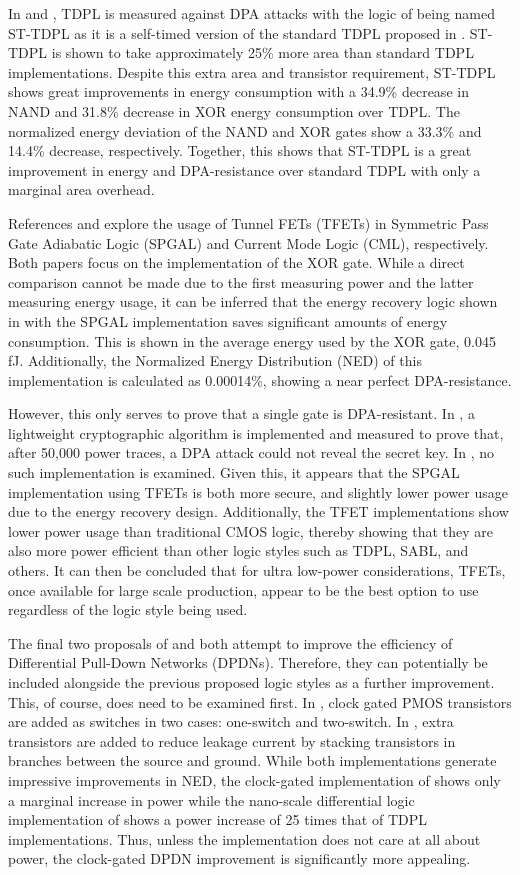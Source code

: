 \documentclass[conference, 12pt]{IEEEtran}
\begin{document}
		In \cite{b1} and \cite{b2}, TDPL is measured against DPA attacks with the logic of \cite{b2} being named ST-TDPL as it is a self-timed version of the standard TDPL proposed in \cite{b1}. ST-TDPL is shown to take approximately 25\% more area than standard TDPL implementations. Despite this extra area and transistor requirement, ST-TDPL shows great improvements in energy consumption with a 34.9\% decrease in NAND and 31.8\% decrease in XOR energy consumption over TDPL. The normalized energy deviation of the NAND and XOR gates show a 33.3\% and 14.4\% decrease, respectively. Together, this shows that ST-TDPL is a great improvement in energy and DPA-resistance over standard TDPL with only a marginal area overhead. 

		References \cite{b3} and \cite{b4} explore the usage of Tunnel FETs (TFETs) in Symmetric Pass Gate Adiabatic Logic (SPGAL) and Current Mode Logic (CML), respectively. Both papers focus on the implementation of the XOR gate. While a direct comparison cannot be made due to the first measuring power and the latter measuring energy usage, it can be inferred that the energy recovery logic shown in \cite{b3} with the SPGAL implementation saves significant amounts of energy consumption. This is shown in the average energy used by the XOR gate, 0.045 fJ. Additionally, the Normalized Energy Distribution (NED) of this implementation is calculated as 0.00014\%, showing a near perfect DPA-resistance. 

		However, this only serves to prove that a single gate is DPA-resistant. In \cite{b3}, a lightweight cryptographic algorithm is implemented and measured to prove that, after 50,000 power traces, a DPA attack could not reveal the secret key. In \cite{b4}, no such implementation is examined. Given this, it appears that the SPGAL implementation using TFETs is both more secure, and slightly lower power usage due to the energy recovery design. Additionally, the TFET implementations show lower power usage than traditional CMOS logic, thereby showing that they are also more power efficient than other logic styles such as TDPL, SABL, and others. It can then be concluded that for ultra low-power considerations, TFETs, once available for large scale production, appear to be the best option to use regardless of the logic style being used.

		The final two proposals of \cite{b5} and \cite{b6} both attempt to improve the efficiency of Differential Pull-Down Networks (DPDNs). Therefore, they can potentially be included alongside the previous proposed logic styles as a further improvement. This, of course, does need to be examined first. In \cite{b5}, clock gated PMOS transistors are added as switches in two cases: one-switch and two-switch. In \cite{b6}, extra transistors are added to reduce leakage current by stacking transistors in branches between the source and ground. While both implementations generate impressive improvements in NED, the clock-gated implementation of \cite{b5} shows only a marginal increase in power while the nano-scale differential logic implementation of \cite{b6} shows a power increase of 25 times that of TDPL implementations. Thus, unless the implementation does not care at all about power, the clock-gated DPDN improvement is significantly more appealing. 
\end{document}
